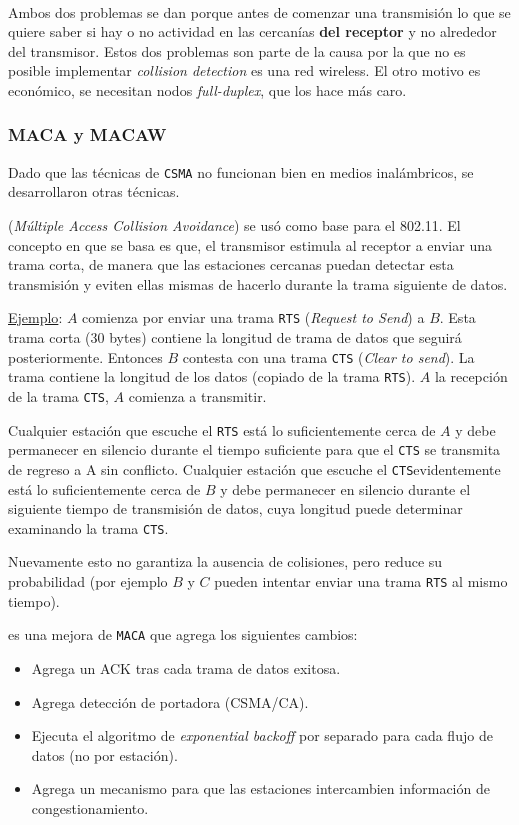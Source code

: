 \documentclass[]{article}
\begin{document}

~\newline

Ambos dos problemas se dan porque antes de comenzar una transmisión lo que se quiere saber si hay o no actividad en las cercanías \textbf{del receptor} y no alrededor del transmisor.
Estos dos problemas son parte de la causa por la que no es posible implementar \emph{collision detection} es una red wireless. El otro motivo es económico, se necesitan nodos \emph{full-duplex}, que los hace más caro.

\subsubsection{MACA y MACAW}
Dado que las técnicas de \texttt{CSMA} no funcionan bien en medios inalámbricos, se desarrollaron otras técnicas.

 (\emph{Múltiple Access Collision Avoidance}) se usó como base para el 802.11. El concepto en que se basa es que, el transmisor estimula al receptor a enviar una trama corta, de manera que las estaciones cercanas puedan detectar esta transmisión y eviten ellas mismas de hacerlo durante la trama siguiente de datos.

\underline{Ejemplo}: $A$ comienza por enviar una trama \texttt{RTS} (\emph{Request to Send}) a $B$. Esta trama corta (30 bytes) contiene la longitud de trama de datos que seguirá posteriormente. Entonces $B$ contesta con una trama \texttt{CTS} (\emph{Clear to send}). La trama contiene la longitud de los datos (copiado de la trama \texttt{RTS}). $A$ la recepción de la trama \texttt{CTS}, $A$ comienza a transmitir.

Cualquier estación que escuche el \texttt{RTS} está lo suficientemente cerca de $A$ y debe permanecer en silencio durante el tiempo suficiente para que el \texttt{CTS} se transmita de regreso a A sin conflicto. Cualquier estación que escuche el \texttt{CTS}evidentemente está lo suficientemente cerca de $B$ y debe permanecer en silencio durante el siguiente tiempo de transmisión de datos, cuya longitud puede determinar examinando la trama \texttt{CTS}.

Nuevamente esto no garantiza la ausencia de colisiones, pero reduce su probabilidad (por ejemplo $B$ y $C$ pueden intentar enviar una trama \texttt{RTS} al mismo tiempo).

 es una mejora de \texttt{MACA} que agrega los siguientes cambios:
\begin{itemize}
    \item Agrega un ACK tras cada trama de datos exitosa.
    \item Agrega detección de portadora (CSMA/CA).
    \item Ejecuta el algoritmo de \emph{exponential backoff} por separado para cada flujo de datos (no por estación).
    \item Agrega un mecanismo para que las estaciones intercambien información de congestionamiento.
\end{itemize}
\end{document}
